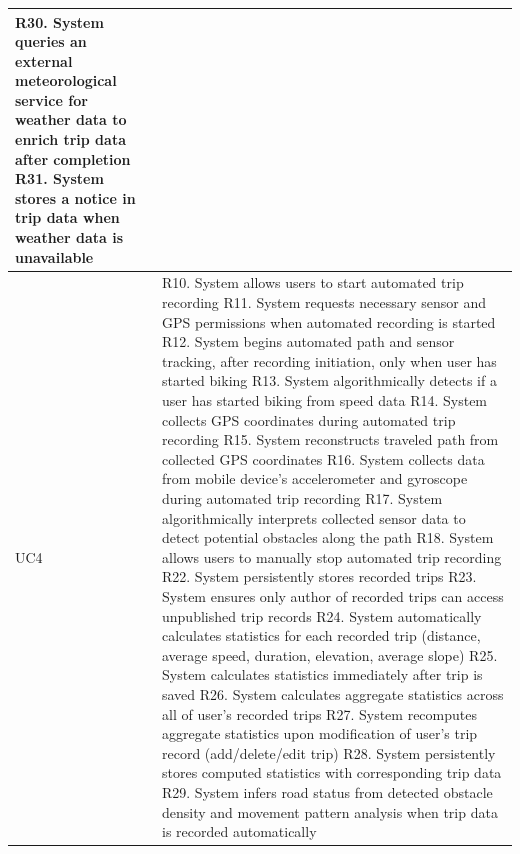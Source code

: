 \begin{longtable}{|p{3cm}|p{12cm}|}
   R30. System queries an external meteorological service for weather data to enrich trip data after completion \newline 
   R31. System stores a notice in trip data when weather data is unavailable \\ \hline
   UC4 & 
   R10. System allows users to start automated trip recording \newline 
   R11. System requests necessary sensor and GPS permissions when automated recording is started \newline 
   R12. System begins automated path and sensor tracking, after recording initiation, only when user has started biking \newline 
   R13. System algorithmically detects if a user has started biking from speed data \newline 
   R14. System collects GPS coordinates during automated trip recording \newline 
   R15. System reconstructs traveled path from collected GPS coordinates \newline 
   R16. System collects data from mobile device’s accelerometer and gyroscope during automated trip recording \newline 
   R17. System algorithmically interprets collected sensor data to detect potential obstacles along the path \newline 
   R18. System allows users to manually stop automated trip recording \newline 
   R22. System persistently stores recorded trips \newline 
   R23. System ensures only author of recorded trips can access unpublished trip records \newline 
   R24. System automatically calculates statistics for each recorded trip (distance, average speed, duration, elevation, average slope) \newline 
   R25. System calculates statistics immediately after trip is saved \newline 
   R26. System calculates aggregate statistics across all of user’s recorded trips \newline 
   R27. System recomputes aggregate statistics upon modification of user’s trip record (add/delete/edit trip) \newline 
   R28. System persistently stores computed statistics with corresponding trip data \newline 
   R29. System infers road status from detected obstacle density and movement pattern analysis when trip data is recorded automatically \newline 

\end{longtable}
